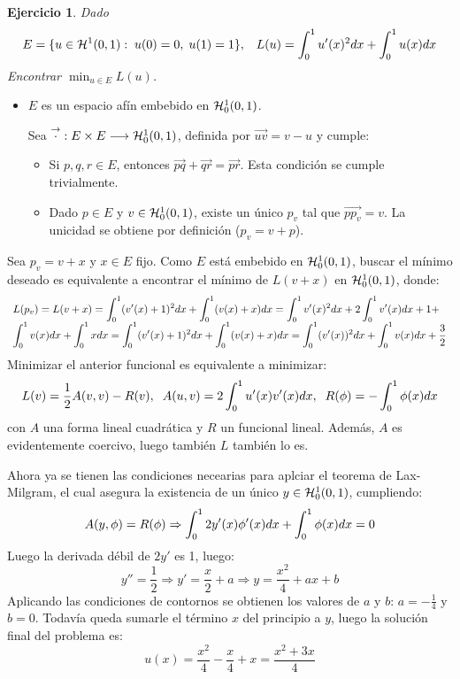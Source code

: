 \documentclass[12pt]{article}
\newcommand{\flechita}[1]{\overset{\rightarrow}{ #1 }}
\newtheorem{ejercicio}{Ejercicio}
\theoremstyle{definition}
\theoremstyle{remark}
\begin{document}

\begin{ejercicio}
Dado
\[
E=\{u\in\sobolev[0,1]{1}: \; u(0)=0, \; u(1)=1\}, \espacio L(u)=\integral{0}{1}{u'(x)^2dx}+\integral{0}{1}{u(x)dx}
\]
Encontrar $\min_{u\in E}L(u)$.
\end{ejercicio}

\begin{itemize}
\item $E$ es un espacio afín embebido en $\sobolevcero[0,1]{1}$.

Sea $\funcion{\overset{\rightarrow}{\cdot}}{E\times E}{\sobolevcero[0,1]{1}}$, definida por $\flechita{uv}=v-u$ y cumple:
\begin{itemize}
\item Si $p,q,r\in E$, entonces $\flechita{pq}+\flechita{qr}=\flechita{pr}$. Esta condición se cumple trivialmente.
\item Dado $p\in E$ y $v\in\sobolevcero[0,1]{1}$, existe un único $p_v$ tal que $\flechita{pp_v}=v$. La unicidad se obtiene por definición ($p_v=v+p$).
\end{itemize}
\end{itemize}

Sea $p_v=v+x$ y $x\in E$ fijo. Como $E$ está embebido en $\sobolevcero[0,1]{1}$, buscar el mínimo deseado es equivalente a encontrar el mínimo de $L(v+x)$ en $\sobolevcero[0,1]{1}$, donde:
\[
\begin{array}{l}
L(p_v)=L(v+x)=\integral{0}{1}{(v'(x)+1)^2dx}+\integral{0}{1}{(v(x)+x)dx}=
\integral{0}{1}{v'(x)^2dx}+2\integral{0}{1}{v'(x)dx}+1+\\
\integral{0}{1}{v(x)dx}+\integral{0}{1}{xdx}=\integral{0}{1}{(v'(x)+1)^2dx}+\integral{0}{1}{(v(x)+x)dx}=
\integral{0}{1}{(v'(x))^2dx}+\integral{0}{1}{v(x)dx}+\frac{3}{2}
\end{array}
\]
Minimizar el anterior funcional es equivalente a minimizar:
\[
L(v)=\frac{1}{2}A(v,v)-R(v), \;\;
A(u,v)=2\integral{0}{1}{u'(x)v'(x)dx}, \;\; R(\phi)=-\integral{0}{1}{\phi(x)dx}
\]
con $A$ una forma lineal cuadrática y $R$ un funcional lineal. Además, $A$ es evidentemente coercivo, luego también $L$ también lo es.

Ahora ya se tienen las condiciones necearias para aplciar el teorema de Lax-Milgram, el cual asegura la existencia de un único $y\in\sobolevcero[0,1]{1}$, cumpliendo:
\[
A(y,\phi)=R(\phi) \Rightarrow \integral{0}{1}{2y'(x)\phi'(x)dx}+\integral{0}{1}{\phi(x)dx}=0
\]
Luego la derivada débil de $2y'$ es 1, luego:
\[
y''=\frac{1}{2} \Rightarrow y'=\frac{x}{2}+a\Rightarrow y=\frac{x^2}{4}+ax+b
\]
Aplicando las condiciones de contornos se obtienen los valores de $a$ y $b$: $a=-\frac{1}{4}$ y $b=0$. Todavía queda sumarle el término $x$ del principio a $y$, luego la solución final del problema es:
\[
u(x)=\frac{x^2}{4}-\frac{x}{4}+x=\frac{x^2+3x}{4}
\]
\end{document}
